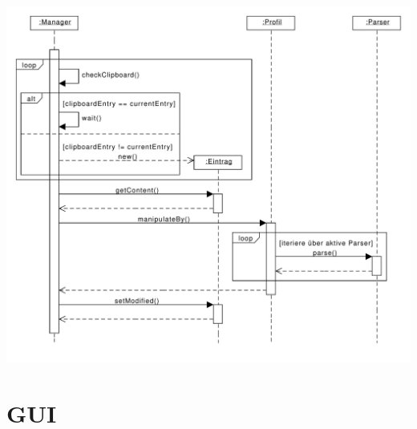 \documentclass[a4paper,11pt,abstracton,titlepage]{scrartcl}
\begin{document}
\includegraphics[width=\dimexpr\textwidth-2\tabcolsep-2pt\relax]{../OOA/Sequence/2-sequensdiagramm.pdf}

\newpage

\section{GUI}
\end{document}
